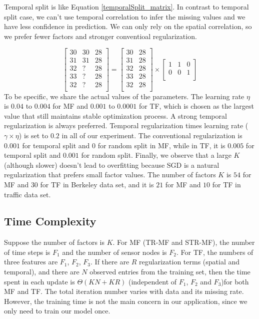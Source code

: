 Temporal split is like Equation \ref{temporalSplit_matrix}.
In contrast to temporal split case, we can't use temporal correlation to infer the missing values and we have less confidence in prediction.
We can only rely on the spatial correlation, so we prefer fewer factors and stronger conventioal regularization.

\begin{equation}
\label{temporalSplit_matrix}
\begin{bmatrix}
30 & 30 & 28\\
31 & 31 & 28\\
32 &  ? & 28\\
33 &  ? & 28\\
32 &  ? & 28\\
\end{bmatrix} 
= 
\begin{bmatrix}
30 & 28\\
31 & 28\\
32 & 28\\
33 & 28\\
32 & 28\\
\end{bmatrix} 
\times
\begin{bmatrix}
1 & 1 & 0\\
0 & 0 & 1\\
\end{bmatrix} 
\end{equation}
To be specific, we share the actual values of the parameters.
The learning rate $\eta$ is $0.04$ to $0.004$ for MF and $0.001$ to $0.0001$ for TF, which is chosen as the largest value that still maintains stable optimization process.
A strong temporal regularization is always preferred.
Temporal regularization times learning rate ($\gamma \times \eta$) is set to $0.2$ in all of our experiment.
The conventional regularization is $0.001$ for temporal split and $0$ for random split in MF, while in TF, it is $0.005$ for temporal split and $0.001$ for random split.
Finally, we observe that a large $K$ (although slower) doesn't lead to overfitting because SGD is a natural regularization that prefers small factor values. 
The number of factors $K$ is $54$ for MF and $30$ for TF in Berkeley data set, and it is $21$ for MF and $10$ for TF in traffic data set. 


\subsection{Time Complexity}
Suppose the number of factors is $K$.
For MF (TR-MF and STR-MF), the number of time steps is $F_1$ and the number of sensor nodes is $F_2$. 
For TF, the numbers of three features are $F_1$, $F_2$, $F_3$.  
If there are $R$ regularization terms (spatial and temporal), and there are $N$ observed entries from the training set, then the time spent in each update is $\Theta(KN + KR)$ (independent of $F_1$, $F_2$ and $F_3$)for both MF and TF. 
The total iteration number varies with data and its missing rate. 
However, the training time is not the main concern in our application, since we only need to train our model once.

